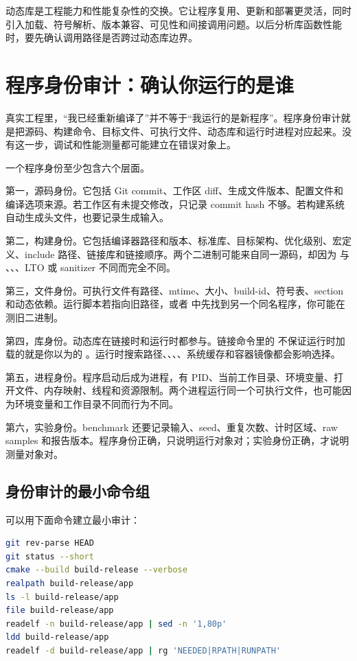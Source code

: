 \begin{deepdive}
动态库是工程能力和性能复杂性的交换。它让程序复用、更新和部署更灵活，同时引入加载、符号解析、版本兼容、可见性和间接调用问题。以后分析库函数性能时，要先确认调用路径是否跨过动态库边界。
\end{deepdive}

\section{程序身份审计：确认你运行的是谁}

真实工程里，“我已经重新编译了”并不等于“我运行的是新程序”。程序身份审计就是把源码、构建命令、目标文件、可执行文件、动态库和运行时进程对应起来。没有这一步，调试和性能测量都可能建立在错误对象上。

一个程序身份至少包含六个层面。

第一，源码身份。它包括 Git commit、工作区 diff、生成文件版本、配置文件和编译选项来源。若工作区有未提交修改，只记录 commit hash 不够。若构建系统自动生成头文件，也要记录生成输入。

第二，构建身份。它包括编译器路径和版本、标准库、目标架构、优化级别、宏定义、include 路径、链接库和链接顺序。两个二进制可能来自同一源码，却因为  与 、、、LTO 或 sanitizer 不同而完全不同。

第三，文件身份。可执行文件有路径、mtime、大小、build-id、符号表、section 和动态依赖。运行脚本若指向旧路径，或者  中先找到另一个同名程序，你可能在测旧二进制。

第四，库身份。动态库在链接时和运行时都参与。链接命令里的  不保证运行时加载的就是你以为的 。运行时搜索路径、、、、系统缓存和容器镜像都会影响选择。

第五，进程身份。程序启动后成为进程，有 PID、当前工作目录、环境变量、打开文件、内存映射、线程和资源限制。两个进程运行同一个可执行文件，也可能因为环境变量和工作目录不同而行为不同。

第六，实验身份。benchmark 还要记录输入、seed、重复次数、计时区域、raw samples 和报告版本。程序身份正确，只说明运行对象对；实验身份正确，才说明测量对象对。

\subsection{身份审计的最小命令组}

可以用下面命令建立最小审计：

\begin{lstlisting}[language=bash]
git rev-parse HEAD
git status --short
cmake --build build-release --verbose
realpath build-release/app
ls -l build-release/app
file build-release/app
readelf -n build-release/app | sed -n '1,80p'
ldd build-release/app
readelf -d build-release/app | rg 'NEEDED|RPATH|RUNPATH'
\end{lstlisting}


